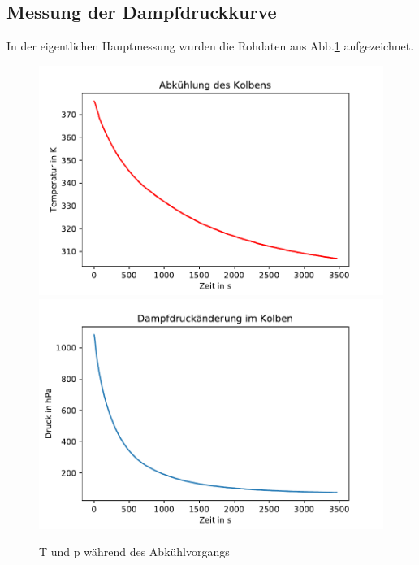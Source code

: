 \documentclass[]{article}
\begin{document}
\subsection{Messung der Dampfdruckkurve}
In der eigentlichen Hauptmessung wurden die Rohdaten aus Abb.\ref{DD_Roh} aufgezeichnet.\\
\begin{figure}
	\begin{center}
		\includegraphics[scale=0.45]{Images/Dampfdruck_T.pdf}
		\includegraphics[scale=0.45]{Images/Dampfdruck_p.pdf}
		\caption{T und p während des Abkühlvorgangs}
		\label{DD_Roh}
	\end{center}
\end{figure}
\end{document}
